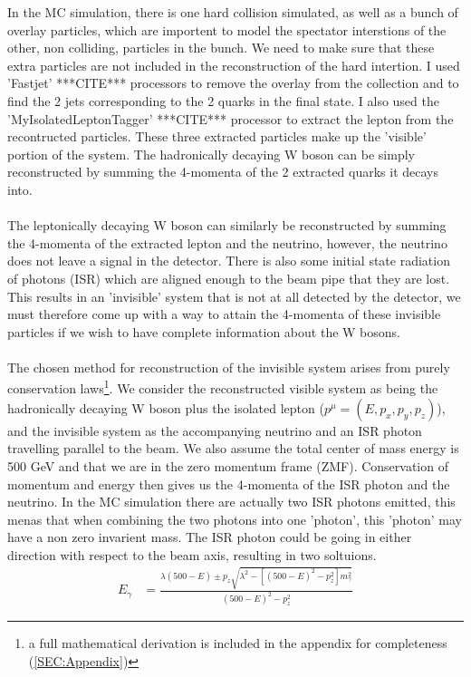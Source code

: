 In the MC simulation, there is one hard collision simulated, as well as a bunch of overlay particles, which are importent to model the spectator interstions of the other, non colliding, particles in the bunch. We need to make sure that these extra particles are not included in the reconstruction of the hard intertion. I used 'Fastjet' ***CITE*** processors to remove the overlay from the collection and to find the 2 jets corresponding to the 2 quarks in the final state. I also used the 'MyIsolatedLeptonTagger' ***CITE*** processor to extract the lepton from the recontructed particles. These three extracted particles make up the 'visible' portion of the system. The hadronically decaying W boson can be simply reconstructed by summing the 4-momenta of the 2 extracted quarks it decays into.
\\\\
The leptonically decaying W boson can similarly be reconstructed by summing the 4-momenta of the extracted lepton and the neutrino, however, the neutrino does not leave a signal in the detector. There is also some initial state radiation of photons (ISR) which are aligned enough to the beam pipe that they are lost. This results in an 'invisible' system that is not at all detected by the detector, we must therefore come up with a way to attain the 4-momenta of these invisible particles if we wish to have complete information about the W bosons.
\\\\
The chosen method for reconstruction of the invisible system arises from purely conservation laws\footnote{ a full mathematical derivation is included in the appendix for completeness (\ref{SEC:Appendix})}. We consider the reconstructed visible system as being the hadronically decaying W boson plus the isolated lepton (${p}^{\mu} = ( E,  {p}_{x}, {p}_{y}, {p}_{z})$), and the invisible system as the accompanying neutrino and an ISR photon travelling parallel to the beam. We also assume the total center of mass energy is 500 GeV and that we are in the zero momentum frame (ZMF). Conservation of momentum and energy then gives us the 4-momenta of the ISR photon and the neutrino. In the MC simulation there are actually two ISR photons emitted, this menas that when combining the two photons into one 'photon', this 'photon' may have a non zero invarient mass. The ISR photon could be going in either direction with respect to the beam axis, resulting in two soltuions.
\begin{align}
\label{EQ:full}
{E}_{\gamma}    &= \frac{{\lambda}(500 - E)  \pm {p}_{z}\sqrt{ {\lambda}^{2} - [{(500 - E)}^{2} -{p}_{z}^{2}]{m}_{\gamma}^{2}}}{{(500 - E)}^{2} -   {p}_{z}^{2}}
   \end{align}
